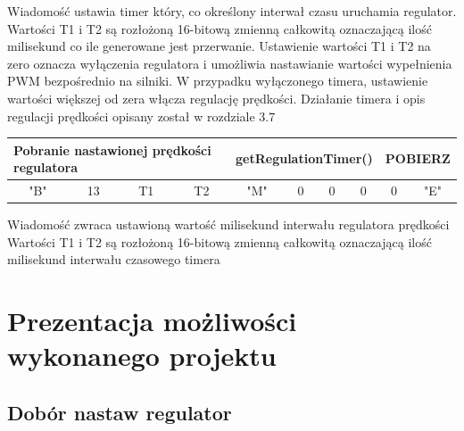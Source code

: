 \documentclass[eng,printmode]{mgr}
\begin{document}
Wiadomość ustawia timer który, co określony interwał czasu uruchamia regulator.
Wartości T1 i T2 są rozłożoną 16-bitową zmienną całkowitą oznaczającą ilość milisekund co ile generowane jest przerwanie.
Ustawienie wartości T1 i T2 na zero oznacza wyłączenia regulatora i umożliwia nastawianie wartości wypełnienia PWM bezpośrednio na silniki. W przypadku wyłączonego timera, ustawienie wartości większej od zera włącza regulację prędkości.
Działanie timera i opis regulacji prędkości opisany został w rozdziale 3.7


\begin{table}[!htb]
\centering
\begin{adjustbox}{width=1\textwidth}
\label{my-label}
\begin{tabular}{|c|c|c|c|c|c|c|c|c|c|}
\hline
\multicolumn{4}{|l|}{Pobranie nastawionej prędkości regulatora   } & \multicolumn{4}{l|}{getRegulationTimer()} & \multicolumn{2}{l|}{POBIERZ} \\ \hline
"B" \hspace{1em}             & 13\hspace{2em}              & T1\hspace{2em}              & T2\hspace{2em}         & "M"\hspace{2em}         & 0\hspace{2em}         & 0\hspace{2em}         & 0\hspace{2em}         & 0\hspace{2em}          & "E"\hspace{2em}          \\ \hline
\end{tabular}
\end{adjustbox}
\end{table}

Wiadomość zwraca ustawioną wartość milisekund interwału regulatora prędkości
Wartości T1 i T2 są rozłożoną 16-bitową zmienną całkowitą oznaczającą ilość milisekund interwału czasowego timera




  \chapter{Prezentacja możliwości wykonanego projektu}

 \section{Dobór nastaw regulator}
\end{document}
